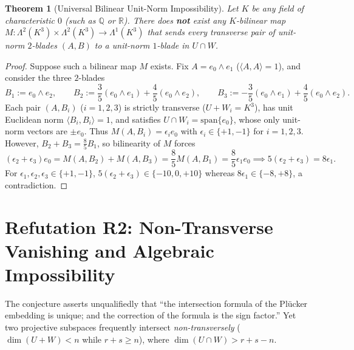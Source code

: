 \documentclass[11pt]{article}
\newtheorem{theorem}{Theorem}[section]
\theoremstyle{definition}
\newcommand{\spn}{\mathrm{span}}
\begin{document}
\begin{theorem}[Universal Bilinear Unit-Norm Impossibility]\label{thm:r1-imposs}
Let $K$ be any field of characteristic $0$ (such as $\mathbb{Q}$ or $\mathbb{R}$). There does \textbf{not} exist any $K$-bilinear map $M : \Lambda^2(K^3) \times \Lambda^2(K^3) \to \Lambda^1(K^3)$ that sends every transverse pair of unit-norm $2$-blades $(A, B)$ to a unit-norm $1$-blade in $U \cap W$.
\end{theorem}
\begin{proof}
Suppose such a bilinear map $M$ exists. Fix $A = e_0 \wedge e_1$ ($\langle A, A \rangle = 1$), and consider the three $2$-blades
\[
  B_1 := e_0 \wedge e_2, \qquad
  B_2 := \frac{3}{5}(e_0 \wedge e_1) + \frac{4}{5}(e_0 \wedge e_2), \qquad
  B_3 := -\frac{3}{5}(e_0 \wedge e_1) + \frac{4}{5}(e_0 \wedge e_2).
\]
Each pair $(A, B_i)$ ($i = 1, 2, 3$) is strictly transverse ($U + W_i = K^3$), has unit Euclidean norm $\langle B_i, B_i \rangle = 1$, and satisfies $U \cap W_i = \spn\{e_0\}$, whose only unit-norm vectors are $\pm e_0$. Thus $M(A, B_i) = \epsilon_i e_0$ with $\epsilon_i \in \{+1, -1\}$ for $i = 1, 2, 3$. However, $B_2 + B_3 = \frac{8}{5} B_1$, so bilinearity of $M$ forces
\[
  (\epsilon_2 + \epsilon_3) e_0 = M(A, B_2) + M(A, B_3) = \frac{8}{5} M(A, B_1) = \frac{8}{5}\epsilon_1 e_0 \implies 5(\epsilon_2 + \epsilon_3) = 8\epsilon_1.
\]
For $\epsilon_1, \epsilon_2, \epsilon_3 \in \{+1, -1\}$, $5(\epsilon_2 + \epsilon_3) \in \{-10, 0, +10\}$ whereas $8\epsilon_1 \in \{-8, +8\}$, a contradiction.
\end{proof}

\section{Refutation R2: Non-Transverse Vanishing and Algebraic Impossibility}\label{sec:r2}

The conjecture asserts unqualifiedly that ``the intersection formula of the Pl\"ucker embedding is unique; and the correction of the formula is the sign factor.'' Yet two projective subspaces frequently intersect \emph{non-transversely} ($\dim(U + W) < n$ while $r + s \ge n$), where $\dim(U \cap W) > r + s - n$.
\end{document}
